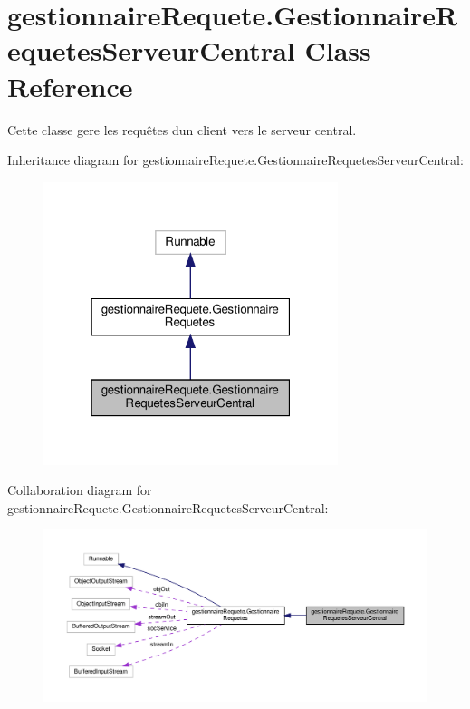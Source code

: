 \hypertarget{classgestionnaireRequete_1_1GestionnaireRequetesServeurCentral}{}\section{gestionnaire\+Requete.\+Gestionnaire\+Requetes\+Serveur\+Central Class Reference}
\label{classgestionnaireRequete_1_1GestionnaireRequetesServeurCentral}


Cette classe gere les requêtes d\textquotesingle{}un client vers le serveur central.  




Inheritance diagram for gestionnaire\+Requete.\+Gestionnaire\+Requetes\+Serveur\+Central\+:\nopagebreak
\begin{figure}[H]
\begin{center}
\leavevmode
\includegraphics[width=244pt]{classgestionnaireRequete_1_1GestionnaireRequetesServeurCentral__inherit__graph}
\end{center}
\end{figure}


Collaboration diagram for gestionnaire\+Requete.\+Gestionnaire\+Requetes\+Serveur\+Central\+:\nopagebreak
\begin{figure}[H]
\begin{center}
\leavevmode
\includegraphics[width=350pt]{classgestionnaireRequete_1_1GestionnaireRequetesServeurCentral__coll__graph}
\end{center}
\end{figure}
